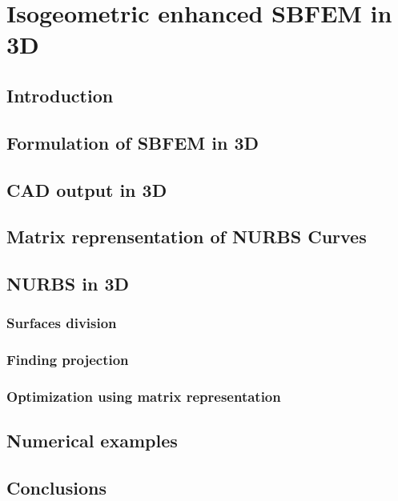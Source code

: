 
\chapter{Isogeometric enhanced SBFEM in 3D}

\section{Introduction}

\section{Formulation of SBFEM in 3D}

\section{CAD output in 3D}

\section{Matrix reprensentation of NURBS Curves}





\section{NURBS in 3D}

    \subsection{Surfaces division}

    \subsection{Finding projection}

    \subsection{Optimization using matrix representation}

\section{Numerical examples}



\section{Conclusions}